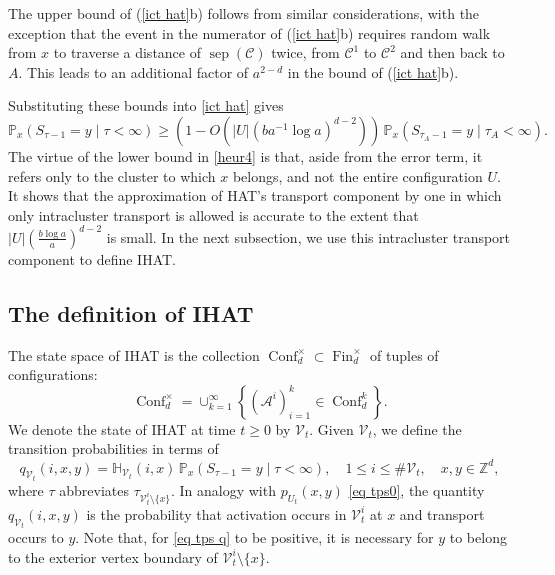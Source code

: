 \documentclass[11pt,reqno]{amsart}
\theoremstyle{definition}
\numberwithin{equation}{section}
\newcommand{\Z}{\mathbb{Z}}
\renewcommand{\P}{\mathbb{P}}
\newcommand{\1}{\mathbf{1}}
\newcommand{\A}{\mathcal{A}}
\renewcommand{\H}{\mathbb{H}}
\renewcommand{\A}{\mathcal{A}}
\DeclareMathOperator{\sep}{sep}
\newcommand{\CC}{\mathcal{C}}
\newcommand{\VV}{\mathcal{V}}
\DeclareMathOperator{\Conf}{\mathrm{Conf}}
\DeclareMathOperator{\Fin}{\mathrm{Fin}}
\begin{document}
The upper bound of (\ref{ict hat}b) follows from similar considerations, with the exception that the event in the numerator of (\ref{ict hat}b) requires random walk from $x$ to traverse a distance of $\sep (\CC)$ twice, from $\CC^1$ to $\CC^2$ and then back to $A$. This leads to an additional factor of $a^{2-d}$ in the bound of (\ref{ict hat}b).



Substituting these bounds into \eqref{ict hat} gives
\begin{equation}\label{heur4}
\P_x (S_{\tau-1} = y \mid \tau < \infty) \geq \left(1 - O \left( |U| \left( b a^{-1} \log a \right)^{d-2} \right) \right) \, \P_x (S_{\tau_A-1} = y \mid \tau_A < \infty).
\end{equation}
The virtue of the lower bound in \eqref{heur4} is that, aside from the error term, it refers only to the cluster to which $x$ belongs, and not the entire configuration $U$. It shows that the approximation of HAT's transport component by one in which only intracluster transport is allowed is accurate to the extent that $|U| (\frac{b\log a}{a})^{d-2}$ is small. In the next subsection, we use this intracluster transport component to define IHAT.
 


\subsection{The definition of IHAT}\label{subsec ihat}



The state space of IHAT is the collection $\Conf_d^\times \subset \Fin_d^\times$ of tuples of configurations: 
\[
\Conf_d^\times = \cup_{k=1}^\infty \left\{ (\A^i)_{i=1}^k \in \Conf_d^k \right\}.
\]
We denote the state of IHAT at time $t \geq 0$ by $\VV_t$. Given $\VV_t$, we define the transition probabilities in terms of 
\begin{equation}\label{eq tps q}
q_{\VV_t} (i,x,y) = \H_{\VV_t} (i,x) \, \P_x ( S_{\tau-1} = y \mid \tau < \infty), \quad 1 \leq i \leq \# \VV_t, \quad x, y \in \Z^d,
\end{equation}
where $\tau$ abbreviates $\tau_{\VV_t^i \setminus \{x\}}$. In analogy with $p_{U_t} (x,y)$ \eqref{eq tps0}, the quantity $q_{\VV_t} (i,x,y)$ is the probability that activation occurs in $\VV_t^i$ at $x$ and transport occurs to $y$. Note that, for \eqref{eq tps q} to be positive, it is necessary for $y$ to belong to the exterior vertex boundary of $\VV_t^i \setminus \{x\}$.
\end{document}

